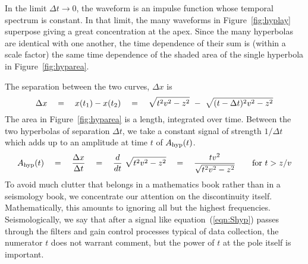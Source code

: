 {

\par
In the limit $\Delta t \rightarrow 0$,
the waveform is an impulse function
whose temporal spectrum is constant.
In that limit, the many waveforms in Figure~\ref{fig:hyplay}
superpose giving a great concentration at the apex.
Since the many hyperbolas are identical with one another,
the time dependence of their sum is (within a scale factor)
the same time dependence of the shaded area of the single hyperbola
in Figure~\ref{fig:hyparea}.

\par
The separation between the two curves, $\Delta x$ is
\begin{equation}
\Delta x \eq 
x(t_1) - x(t_2) \eq
   \sqrt{ t          ^2v^2-z^2}  \ -\ 
   \sqrt{(t-\Delta t)^2v^2-z^2}
\end{equation}
The area in Figure~\ref{fig:hyparea} is a length, integrated over time.
Between the two hyperbolas of separation $\Delta t$,
we take a constant signal of strength $1/\Delta t$ which
adds up to an amplitude at time $t$ of $A_{\rm hyp}(t)$.
\begin{equation}
A_{\rm hyp}(t) \quad =\quad
{\Delta x \over \Delta t} \quad =\quad
{d \over dt} \ \sqrt{t^2 v^2-z^2} 
\quad =\quad
{t v^2\over \sqrt{t^2 v^2-z^2} }
\quad \quad {\rm for} ~ t>z/v
\label{eqn:Shyp}
\end{equation}
To avoid much clutter that belongs in a mathematics book
rather than in a seismology book,
we concentrate our attention on the discontinuity itself.
Mathematically, this amounts to ignoring all but the highest frequencies.
Seismologically, we say that
after a signal like equation~(\ref{eqn:Shyp}) passes through the filters
and gain control processes typical of data collection,
the numerator $t$ does not warrant comment,
but the power of $t$ at the pole itself is important.

}
